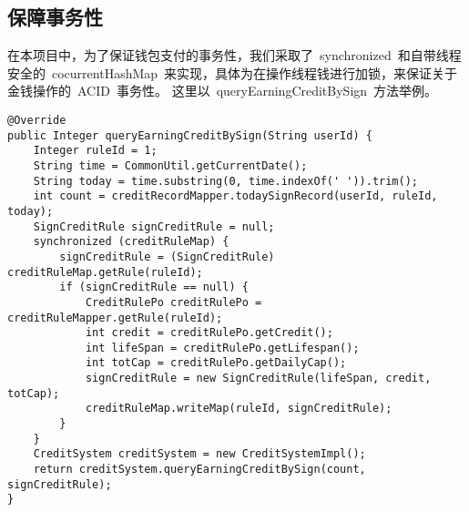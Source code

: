 \subsection{保障事务性}
在本项目中，为了保证钱包支付的事务性，我们采取了~synchronized~和自带线程安全的~cocurrentHashMap~来实现，具体为在操作线程钱进行加锁，来保证关于金钱操作的~ACID~事务性。
这里以~queryEarningCreditBySign~方法举例。

\begin{lstlisting}[basicstyle=\footnotesize]
@Override
public Integer queryEarningCreditBySign(String userId) {
	Integer ruleId = 1;
	String time = CommonUtil.getCurrentDate();
	String today = time.substring(0, time.indexOf(' ')).trim();
	int count = creditRecordMapper.todaySignRecord(userId, ruleId, today);
	SignCreditRule signCreditRule = null;
	synchronized (creditRuleMap) {
		signCreditRule = (SignCreditRule) creditRuleMap.getRule(ruleId);
		if (signCreditRule == null) {
			CreditRulePo creditRulePo = creditRuleMapper.getRule(ruleId);
			int credit = creditRulePo.getCredit();
			int lifeSpan = creditRulePo.getLifespan();
			int totCap = creditRulePo.getDailyCap();
			signCreditRule = new SignCreditRule(lifeSpan, credit, totCap);
			creditRuleMap.writeMap(ruleId, signCreditRule);
		}
	}
	CreditSystem creditSystem = new CreditSystemImpl();
	return creditSystem.queryEarningCreditBySign(count, signCreditRule);
}
\end{lstlisting}

